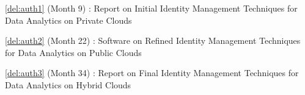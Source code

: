 \begin{Workpackage}{\thewpno}
\begin{WPDeliverables}
  \begin{compactitem}
  \item \ref{del:auth1} (Month 9) : Report on Initial Identity Management Techniques for Data Analytics on Private Clouds
	\item \ref{del:auth2} (Month 22) : Software on Refined Identity Management Techniques for Data Analytics on Public Clouds
\item \ref{del:auth3} (Month 34) : Report on Final Identity Management Techniques for Data Analytics on Hybrid Clouds
\end{compactitem}
\end{WPDeliverables}
\end{Workpackage}
